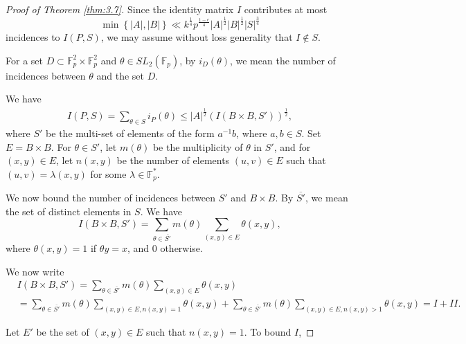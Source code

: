 \documentclass[11pt]{article}
\def\lv{\left\vert}
\def\rv{\right\vert}
\def\lo{\left\{}
\def\ro{\right\}}
\begin{document}
\begin{proof}[Proof of Theorem \ref{thm:3.7}]
Since the identity matrix $I$ contributes at most $$\min \lo |A|,|B|\ro \ll k^{\frac{1}{4}}p^{\frac{1-\epsilon }{4}}\lv A\rv^{\frac{1}{2}} \lv B\rv^{\frac{1}{2}} |S|^{\frac{3}{4}}$$ incidences to $I(P,S)$, we may assume without loss generality that $I \not\in S$.

    For a set $D\subset \mathbb{F}_p^2\times \mathbb{F}_p^2$ and $\theta\in SL_2(\mathbb{F}_p)$, by $i_{D}(\theta)$, we mean the number of incidences between $\theta$ and the set $D$. 

We have 
\begin{align*}
I(P, S)=\sum_{\theta\in S}i_P(\theta) \le |A|^{\frac{1}{2}}\left(I(B\times B, S')\right)^{\frac{1}{2}},
\end{align*}
where $S'$ be the multi-set of elements of the form $a^{-1}b$, where $a,b\in S$. Set $E=B\times B$. For $\theta\in S'$, let $m(\theta)$ be the multiplicity of $\theta$ in $S'$, and for $(x, y)\in E$, let $n(x, y)$ be the number of elements $(u, v)\in E$ such that $(u, v)=\lambda (x, y)$ for some $\lambda\in \mathbb{F}^*_p$. 

We now bound the number of incidences between $S'$ and $B\times B$. By $\overline{S'}$, we mean the set of distinct elements in $S$. We have 
\[I(B\times B, S')=\sum_{\theta\in \overline{S'}}m(\theta)\sum_{(x, y)\in E}\theta(x, y),\]
where $\theta(x, y)=1$ if $\theta y=x$, and $0$ otherwise. 

We now write
\begin{align*}
    &I(B\times B, S')=\sum_{\theta\in \overline{S'}}m(\theta)\sum_{(x, y)\in E}\theta(x, y)\\
    &=\sum_{\theta\in \overline{S'}}m(\theta)\sum_{(x, y)\in E, n(x, y)=1}\theta(x, y)+\sum_{\theta\in \overline{S'}}m(\theta)\sum_{(x, y)\in E, n(x, y)>1}\theta(x, y)=I+II.
\end{align*}

Let $E'$ be the set of $(x, y)\in E$ such that $n(x, y)=1$. 
To bound $I$, 


\end{proof}
\end{document}
